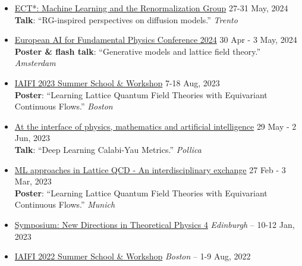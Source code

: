 \documentclass[11pt, letterpaper]{article}
\newcommand{\dateright}[1]{\hfill{\small\color{accentblue} #1}}
\begin{document}
\begin{itemize}[resume, itemsep=5pt]
    \item {\href{https://indico.ectstar.eu/event/206/contributions/4799/}{ECT*: Machine Learning and the Renormalization Group}} \dateright{ 27-31 May, 2024} \\
    {\footnotesize \textbf{Talk}: “RG-inspired perspectives on diffusion models.”} \dateright{{\color{black}\textit{Trento}}}

    \item {\href{https://indico.nikhef.nl/event/4875/contributions/20373/}{European AI for Fundamental Physics Conference 2024}} \dateright{ 30 Apr - 3 May, 2024} \\
    {\footnotesize \textbf{Poster \& flash talk}: “Generative models and lattice field theory.”} \dateright{{\color{black}\textit{Amsterdam}}}

    \item {\href{https://iaifi.org/past-workshops.html}{IAIFI 2023 Summer School \& Workshop}} \dateright{ 7-18 Aug, 2023} \\
    {\footnotesize \textbf{Poster}: “Learning Lattice Quantum Field Theories with Equivariant Continuous Flows.”} \dateright{{\color{black}\textit{Boston}}}

    \item {\href{https://agenda.infn.it/event/33851/}{At the interface of physics, mathematics and artificial intelligence}} \dateright{ 29 May - 2 Jun, 2023} \\
    {\footnotesize \textbf{Talk}: “Deep Learning Calabi-Yau Metrics.”} \dateright{{\color{black}\textit{Pollica}}}

    \item {\href{https://indico.ph.tum.de/event/7116/}{ML approaches in Lattice QCD - An interdisciplinary exchange}} \dateright{ 27 Feb - 3 Mar, 2023} \\
    {\footnotesize \textbf{Poster}: “Learning Lattice Quantum Field Theories with Equivariant Continuous Flows.”} \dateright{{\color{black}\textit{Munich}}}

    \item {\href{https://indico.ph.ed.ac.uk/event/124/}{Symposium: New Directions in Theoretical Physics 4}} \dateright{{\color{black}\textit{Edinburgh} -- } 10-12 Jan, 2023}

    \item {\href{https://iaifi.org/past-workshops.html}{IAIFI 2022 Summer School \& Workshop}} \dateright{{\color{black}\textit{Boston} --} 1-9 Aug, 2022}


\end{itemize}
\end{document}
